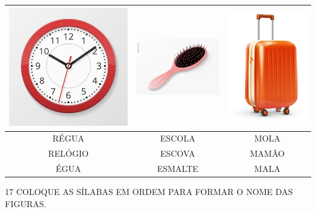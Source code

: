 \begin{center}
\begin{tabular}{ccc}
\multicolumn{1}{l}{\includegraphics[width=.2\textwidth]{media/image74.png}} & \multicolumn{1}{l}{\includegraphics[width=.2\textwidth]{media/image75.png} } & \multicolumn{1}{l}{\includegraphics[width=.2\textwidth]{media/image76.png}} \\ \hline
\multicolumn{1}{|c|}{RÉGUA} & \multicolumn{1}{c|}{ESCOLA} & \multicolumn{1}{c|}{MOLA} \\ \hline
\multicolumn{1}{|c|}{RELÓGIO} & \multicolumn{1}{c|}{ESCOVA} & \multicolumn{1}{c|}{MAMÃO} \\ \hline
\multicolumn{1}{|c|}{ÉGUA} & \multicolumn{1}{c|}{ESMALTE} & \multicolumn{1}{c|}{MALA} \\ \hline
\end{tabular}
\end{center}

\num{17} COLOQUE AS SÍLABAS EM ORDEM PARA FORMAR O NOME DAS FIGURAS.

